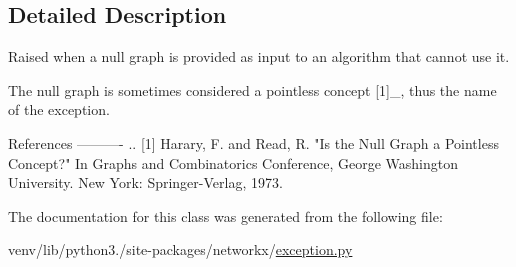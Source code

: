 \subsection{Detailed Description}
\begin{DoxyVerb}Raised when a null graph is provided as input to an algorithm
that cannot use it.

The null graph is sometimes considered a pointless concept [1]_,
thus the name of the exception.

References
----------
.. [1] Harary, F. and Read, R. "Is the Null Graph a Pointless
   Concept?"  In Graphs and Combinatorics Conference, George
   Washington University.  New York: Springer-Verlag, 1973.\end{DoxyVerb}
 

The documentation for this class was generated from the following file\+:\begin{DoxyCompactItemize}
\item 
venv/lib/python3./site-\/packages/networkx/\hyperlink{exception_8py}{exception.\+py}\end{DoxyCompactItemize}
